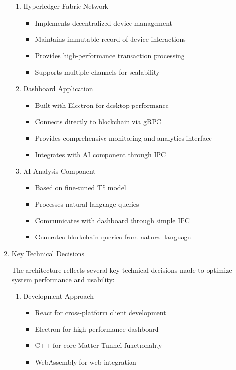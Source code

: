 \documentclass[conference]{IEEEtran}
\begin{document}
\begin{enumerate}[itemsep=2ex, parsep=1ex]
\begin{enumerate}
		\item Hyperledger Fabric Network
		      \begin{itemize}[itemsep=0.5pt, parsep=0.5pt]
		      	\item Implements decentralized device management
		      	\item Maintains immutable record of device interactions
		      	\item Provides high-performance transaction processing
		      	\item Supports multiple channels for scalability
		      \end{itemize}
		      		      		      
		\item Dashboard Application
		      \begin{itemize}[itemsep=0.5pt, parsep=0.5pt]
		      	\item Built with Electron for desktop performance
		      	\item Connects directly to blockchain via gRPC
		      	\item Provides comprehensive monitoring and analytics interface
		      	\item Integrates with AI component through IPC
		      \end{itemize}
		      		      		      
		\item AI Analysis Component
		      \begin{itemize}[itemsep=0.5pt, parsep=0.5pt]
		      	\item Based on fine-tuned T5 model
		      	\item Processes natural language queries
		      	\item Communicates with dashboard through simple IPC
		      	\item Generates blockchain queries from natural language
		      \end{itemize}
	\end{enumerate}
			
	\item{Key Technical Decisions}
			
	The architecture reflects several key technical decisions made to optimize system performance and usability:
			
	\begin{enumerate}
		\item Development Approach
		      \begin{itemize}[itemsep=0.5pt, parsep=0.5pt]
		      	\item React for cross-platform client development
		      	\item Electron for high-performance dashboard
		      	\item C++ for core Matter Tunnel functionality
		      	\item WebAssembly for web integration
		      \end{itemize}
		      		      		      

\end{enumerate}
\end{enumerate}
\end{document}
